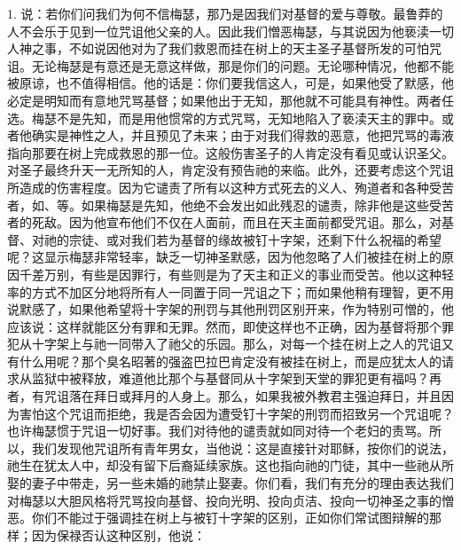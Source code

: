 1. 说：若你们问我们为何不信梅瑟，那乃是因我们对基督的爱与尊敬。最鲁莽的人不会乐于见到一位咒诅他父亲的人。因此我们憎恶梅瑟，与其说因为他亵渎一切人神之事，不如说因他对为了我们救恩而挂在树上的天主圣子基督所发的可怕咒诅。无论梅瑟是有意还是无意这样做，那是你们的问题。无论哪种情况，他都不能被原谅，也不值得相信。他的话是：你们要我信这人，可是，如果他受了默感，他必定是明知而有意地咒骂基督；如果他出于无知，那他就不可能具有神性。两者任选。梅瑟不是先知，而是用他惯常的方式咒骂，无知地陷入了亵渎天主的罪中。或者他确实是神性之人，并且预见了未来；由于对我们得救的恶意，他把咒骂的毒液指向那要在树上完成救恩的那一位。这般伤害圣子的人肯定没有看见或认识圣父。对圣子最终升天一无所知的人，肯定没有预告祂的来临。此外，还要考虑这个咒诅所造成的伤害程度。因为它谴责了所有以这种方式死去的义人、殉道者和各种受苦者，如、等。如果梅瑟是先知，他绝不会发出如此残忍的谴责，除非他是这些受苦者的死敌。因为他宣布他们不仅在人面前，而且在天主面前都受咒诅。那么，对基督、对祂的宗徒、或对我们若为基督的缘故被钉十字架，还剩下什么祝福的希望呢？这显示梅瑟非常轻率，缺乏一切神圣默感，因为他忽略了人们被挂在树上的原因千差万别，有些是因罪行，有些则是为了天主和正义的事业而受苦。他以这种轻率的方式不加区分地将所有人一同置于同一咒诅之下；而如果他稍有理智，更不用说默感了，如果他希望将十字架的刑罚与其他刑罚区别开来，作为特别可憎的，他应该说：这样就能区分有罪和无罪。然而，即使这样也不正确，因为基督将那个罪犯从十字架上与祂一同带入了祂父的乐园。那么，对每一个挂在树上之人的咒诅又有什么用呢？那个臭名昭著的强盗巴拉巴肯定没有被挂在树上，而是应犹太人的请求从监狱中被释放，难道他比那个与基督同从十字架到天堂的罪犯更有福吗？再者，有咒诅落在拜日或拜月的人身上。那么，如果我被外教君主强迫拜日，并且因为害怕这个咒诅而拒绝，我是否会因为遭受钉十字架的刑罚而招致另一个咒诅呢？也许梅瑟惯于咒诅一切好事。我们对待他的谴责就如同对待一个老妇的责骂。所以，我们发现他咒诅所有青年男女，当他说：这是直接针对耶稣，按你们的说法，祂生在犹太人中，却没有留下后裔延续家族。这也指向祂的门徒，其中一些祂从所娶的妻子中带走，另一些未婚的祂禁止娶妻。你们看，我们有充分的理由表达我们对梅瑟以大胆风格将咒骂投向基督、投向光明、投向贞洁、投向一切神圣之事的憎恶。你们不能过于强调挂在树上与被钉十字架的区别，正如你们常试图辩解的那样；因为保禄否认这种区别，他说：\par


